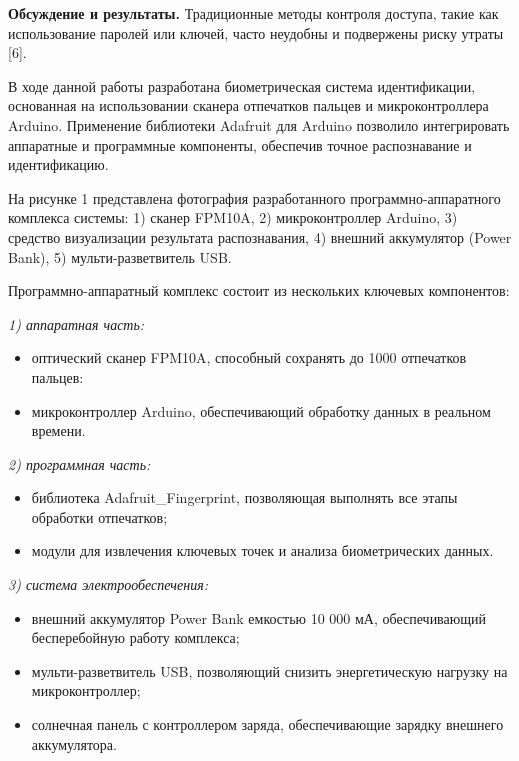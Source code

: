 \begin{multicols}{2}
{\bfseries Обсуждение и результаты.} Традиционные методы контроля доступа,
такие как использование паролей или ключей, часто неудобны и подвержены
риску утраты {[}6{]}.

В ходе данной работы разработана биометрическая система идентификации,
основанная на использовании сканера отпечатков пальцев и
микроконтроллера Arduino. Применение библиотеки Adafruit для Arduino
позволило интегрировать аппаратные и программные компоненты, обеспечив
точное распознавание и идентификацию.

На рисунке 1 представлена фотография разработанного
программно-аппаратного комплекса системы: 1) сканер FPM10A, 2)
микроконтроллер Arduino, 3) средство визуализации результата
распознавания, 4) внешний аккумулятор (Power Bank), 5)
мульти-разветвитель USB.

Программно-аппаратный комплекс состоит из нескольких ключевых
компонентов:

\emph{1) аппаратная часть:}

\begin{itemize}[leftmargin=*]
\item
  оптический сканер FPM10A, способный сохранять до 1000 отпечатков
  пальцев:
\item
  микроконтроллер Arduino, обеспечивающий обработку данных в реальном
  времени.
\end{itemize}

\emph{2) программная часть:}

\begin{itemize}[leftmargin=*]
\item
  библиотека Adafruit\_Fingerprint, позволяющая выполнять все этапы
  обработки отпечатков;
\item
  модули для извлечения ключевых точек и анализа биометрических данных.
\end{itemize}

\emph{3) система электрообеспечения:}

\begin{itemize}[leftmargin=*]
\item
  внешний аккумулятор Power Bank емкостью 10 000 мА, обеспечивающий
  бесперебойную работу комплекса;
\item
  мульти-разветвитель USB, позволяющий снизить энергетическую нагрузку
  на микроконтроллер;
\item
  солнечная панель с контроллером заряда, обеспечивающие зарядку
  внешнего аккумулятора.
\end{itemize}
\end{multicols}

